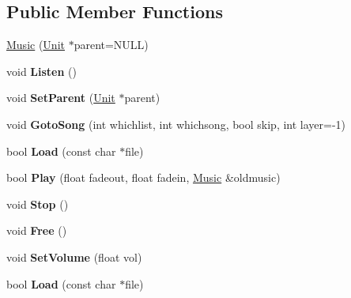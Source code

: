 \subsection*{Public Member Functions}
\begin{DoxyCompactItemize}
\item 
\hyperlink{classMusic_a61581ffcb7a7ef4a822a2e92429942ae}{Music} (\hyperlink{classUnit}{Unit} $\ast$parent=N\+U\+LL)
\item 
void {\bfseries Listen} ()\hypertarget{classMusic_a28e5211a6bcd385e81c7e42ad6c3e521}{}\label{classMusic_a28e5211a6bcd385e81c7e42ad6c3e521}

\item 
void {\bfseries Set\+Parent} (\hyperlink{classUnit}{Unit} $\ast$parent)\hypertarget{classMusic_adfdbbe567168c6b52f7d182d37f1cac6}{}\label{classMusic_adfdbbe567168c6b52f7d182d37f1cac6}

\item 
void {\bfseries Goto\+Song} (int whichlist, int whichsong, bool skip, int layer=-\/1)\hypertarget{classMusic_abf81922e330ca5bb6aee297a004841c4}{}\label{classMusic_abf81922e330ca5bb6aee297a004841c4}

\item 
bool {\bfseries Load} (const char $\ast$file)\hypertarget{classMusic_ad5be6766f8acc442a163b0b7746282ce}{}\label{classMusic_ad5be6766f8acc442a163b0b7746282ce}

\item 
bool {\bfseries Play} (float fadeout, float fadein, \hyperlink{classMusic}{Music} \&oldmusic)\hypertarget{classMusic_ad71c16ad204e1951a0d7ef8a5db0044f}{}\label{classMusic_ad71c16ad204e1951a0d7ef8a5db0044f}

\item 
void {\bfseries Stop} ()\hypertarget{classMusic_aba50daa8b632b6019506a3481a0fc760}{}\label{classMusic_aba50daa8b632b6019506a3481a0fc760}

\item 
void {\bfseries Free} ()\hypertarget{classMusic_a11e0a0d4323d89642e84f2c1ff258e49}{}\label{classMusic_a11e0a0d4323d89642e84f2c1ff258e49}

\item 
void {\bfseries Set\+Volume} (float vol)\hypertarget{classMusic_ae7db2c52870c9d5829354c12c1f81349}{}\label{classMusic_ae7db2c52870c9d5829354c12c1f81349}

\item 
bool {\bfseries Load} (const char $\ast$file)\hypertarget{classMusic_ad5be6766f8acc442a163b0b7746282ce}{}\label{classMusic_ad5be6766f8acc442a163b0b7746282ce}


\end{DoxyCompactItemize}
